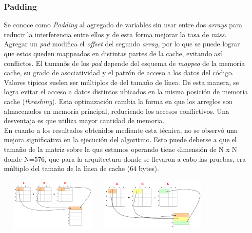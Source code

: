 \documentclass[a4paper,10pt]{article}
\begin{document}
\subsubsection*{Padding}
Se conoce como \textit{Padding} al agregado de variables sin usar entre dos \textit{arrays} para reducir la interferencia entre ellos y de esta forma mejorar la tasa de \textit{miss}. Agregar un \textit{pad} modifica el \textit{offset} del segundo \textit{array}, por lo que se puede lograr que estos queden mappeados en distintas partes de la cache, evitando as\'i conflictos. El taman\~os de los \textit{pad} depende del esquema de \textit{mappeo} de la memoria cache, su grado de asociatividad y el patr\'on de acceso a los datos del c\'odigo. Valores t\'ipicos suelen ser m\'ultiplos de del tama\~no de l\'inea.
De esta manera, se logra evitar el acceso a datos distintos ubicados en la misma posici\'on de memoria cache (\textit{thrashing}).
Esta optimizaci\'on cambia la forma en que los arreglos son almacenados en memoria principal, reduciendo los accesos conflictivos. Una desventaja es que utiliza mayor cantidad de memoria.\\
En cuanto a los resultados obtenidos mediante esta t\'ecnica, no se observ\'o una mejora significativa en la ejecuci\'on del algoritmo. Esto puede deberse a que el tama\~no de la matriz sobre la que 
estamos operando tiene dimensi\'on de N x N donde N=576, que para la arquitectura donde se llevaron a cabo las pruebas, era m\'ultiplo del tama\~no de la l\'inea de cache (64 bytes). \\
\begin{center}
 \includegraphics[width=200px,height=100px]{./padding1.png}
 \includegraphics[width=200px,height=100px]{./padding2.png}

\end{center}
\end{document}
